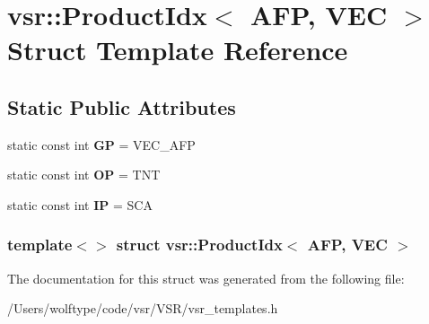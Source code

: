 \hypertarget{structvsr_1_1_product_idx_3_01_a_f_p_00_01_v_e_c_01_4}{\section{vsr\-:\-:Product\-Idx$<$ A\-F\-P, V\-E\-C $>$ Struct Template Reference}
\label{structvsr_1_1_product_idx_3_01_a_f_p_00_01_v_e_c_01_4}
}
\subsection*{Static Public Attributes}
\begin{DoxyCompactItemize}
\item 
\hypertarget{structvsr_1_1_product_idx_3_01_a_f_p_00_01_v_e_c_01_4_a50c86156d611041110d1d9ad8cf79144}{static const int {\bfseries G\-P} = V\-E\-C\-\_\-\-A\-F\-P}\label{structvsr_1_1_product_idx_3_01_a_f_p_00_01_v_e_c_01_4_a50c86156d611041110d1d9ad8cf79144}

\item 
\hypertarget{structvsr_1_1_product_idx_3_01_a_f_p_00_01_v_e_c_01_4_a81f1f966feedc06bbf199574c1f50035}{static const int {\bfseries O\-P} = T\-N\-T}\label{structvsr_1_1_product_idx_3_01_a_f_p_00_01_v_e_c_01_4_a81f1f966feedc06bbf199574c1f50035}

\item 
\hypertarget{structvsr_1_1_product_idx_3_01_a_f_p_00_01_v_e_c_01_4_a4e74140a6e4e767b40c911667f915590}{static const int {\bfseries I\-P} = S\-C\-A}\label{structvsr_1_1_product_idx_3_01_a_f_p_00_01_v_e_c_01_4_a4e74140a6e4e767b40c911667f915590}

\end{DoxyCompactItemize}
\subsubsection*{template$<$$>$ struct vsr\-::\-Product\-Idx$<$ A\-F\-P, V\-E\-C $>$}



The documentation for this struct was generated from the following file\-:\begin{DoxyCompactItemize}
\item 
/\-Users/wolftype/code/vsr/\-V\-S\-R/vsr\-\_\-templates.\-h\end{DoxyCompactItemize}
